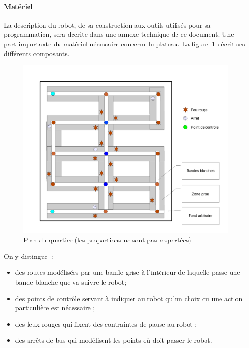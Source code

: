 \documentclass[11pt,a4paper]{article}
\begin{document}
\paragraph{Matériel} 
La description du robot, de sa construction aux outils utilisés pour
sa programmation, sera décrite dans une annexe technique de ce
document. Une part importante du matériel nécessaire concerne le
plateau. La figure~\ref{fig:plan} décrit ses différents composants. 

\begin{figure}
\begin{center}
\includegraphics[width=14cm]{images/city}
\end{center}
\caption{Plan du quartier (les proportions ne sont pas respectées).}
\label{fig:plan}
\end{figure}

On y distingue~:
\begin{itemize}
\item des routes modélisées par une bande grise à l'intérieur de laquelle passe une bande blanche que
va suivre le robot; 

\item des points de contrôle servant à indiquer au robot qu'un choix ou une action particulière 
  est nécessaire ;

\item des feux rouges qui fixent des contraintes de pause au robot ;

\item des arrêts de bus qui modélisent les points où doit passer le robot.
\end{itemize}
\end{document}
